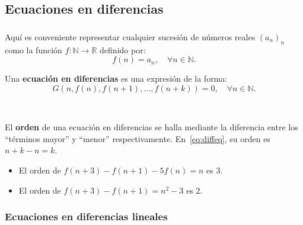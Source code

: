 \subsection{Ecuaciones en diferencias}

\begin{frame}
\frametitle{\subsecname}

Aquí es conveniente representar cualquier sucesión de números reales $(a_{n})_{n} $ como la función $f\colon\mathds{N}\rightarrow\mathds{R}$ definido por: \[ f(n)=a_{n},\quad\forall n\in\mathds{N}. \]

\begin{definition}
	Una \textbf{ecuación en diferencias} es una expresión de la forma:
		\begin{equation}\label{eq:diffeq}
			G\left(n,f(n),f\left(n+1\right),\ldots,f\left(n+k\right)\right)=0,\quad\forall n\in\mathds{N}.
		\end{equation}
\end{definition}

\

El \textbf{orden} de una ecuación en diferencias se halla mediante la diferencia entre los ``términos mayor'' y ``menor'' respectivamente. En~\eqref{eq:diffeq}, su orden es \alert{$n+k-n=k$}.%

\begin{example}
	\begin{itemize}
		\item El \alert{orden} de $f\left(n+3\right)-f\left(n+1\right)-5f(n)=n$ es \alert{$3$}.
		\item El \alert{orden} de $f\left(n+3\right)-f\left(n+1\right)=n^{2}-3$ es \alert{$2$}.
	\end{itemize}
\end{example}
\end{frame}

\subsubsection{Ecuaciones en diferencias lineales}

